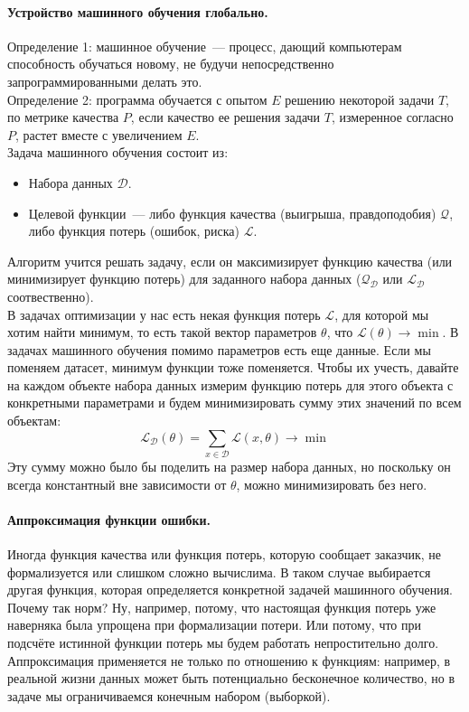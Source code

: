 \documentclass{article}
\begin{document}
    \paragraph{Устройство машинного обучения глобально.}
    Определение 1: машинное обучение~--- процесс, дающий компьютерам способность обучаться новому, не будучи непосредственно запрограммированными делать это.\\
    Определение 2: программа обучается с опытом $E$ решению некоторой задачи $T$, по метрике качества $P$, если качество ее решения задачи $T$, измеренное согласно $P$, растет вместе с увеличением $E$.\\
    Задача машинного обучения состоит из:
    \begin{itemize}
        \item Набора данных $\mathcal{D}$.
        \item Целевой функции~--- либо функция качества (выигрыша, правдоподобия) $\mathcal{Q}$, либо функция потерь (ошибок, риска) $\mathcal{L}$.
    \end{itemize}
    Алгоритм учится решать задачу, если он максимизирует функцию качества (или минимизирует функцию потерь) для заданного набора данных ($\mathcal Q_{\mathcal D}$ или $\mathcal L_{\mathcal D}$ соотвественно).\\
    В задачах оптимизации у нас есть некая функция потерь $\mathcal{L}$, для которой мы хотим найти минимум, то есть такой вектор параметров $\theta$, что $\mathcal{L}(\theta)\rightarrow\min$. В задачах машинного обучения помимо параметров есть еще данные. Если мы поменяем датасет, минимум функции тоже поменяется. Чтобы их учесть, давайте на каждом объекте набора данных измерим функцию потерь для этого объекта с конкретными параметрами и будем минимизировать сумму этих значений по всем объектам:
    \[\mathcal{L}_{\mathcal{D}}(\theta)=\sum_{x\in\mathcal{D}}\mathcal{L}(x, \theta)\rightarrow\min\]
    Эту сумму можно было бы поделить на размер набора данных, но поскольку он всегда константный вне зависимости от $\theta$, можно минимизировать без него.
    \paragraph{Аппроксимация функции ошибки.}
    Иногда функция качества или функция потерь, которую сообщает заказчик, не формализуется или слишком сложно вычислима. В таком случае выбирается другая функция, которая определяется конкретной задачей машинного обучения. Почему так норм? Ну, например, потому, что настоящая функция потерь уже наверняка была упрощена при формализации потери. Или потому, что при подсчёте истинной функции потерь мы будем работать непростительно долго.\\
    Аппроксимация применяется не только по отношению к функциям: например, в реальной жизни данных может быть потенциально бесконечное количество, но в задаче мы ограничиваемся конечным набором (выборкой).
\end{document}
